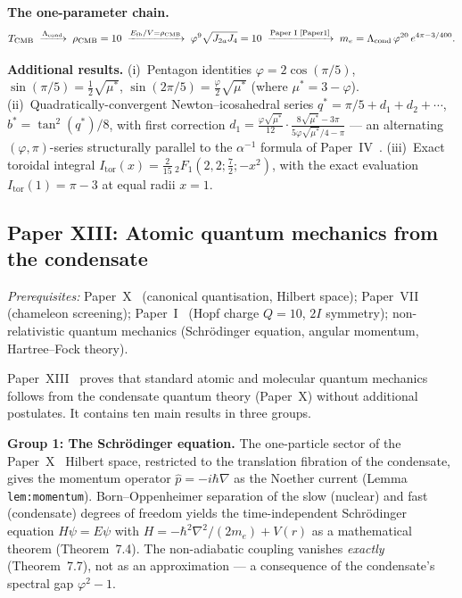 \documentclass[11pt,a4paper]{article}
\newcommand{\vp}{\varphi}
\newcommand{\twoI}{2I}
\newcommand{\TCMB}{T_{\mathrm{CMB}}}
\begin{document}
\textbf{The one-parameter chain.}
\[
  \TCMB
  \;\xrightarrow{\Lambda_{\mathrm{cond}}}\;
  \rho_{\mathrm{CMB}}=10
  \;\xrightarrow{E_{\mathrm{fb}}/V=\rho_{\mathrm{CMB}}}\;
  \vp^9\sqrt{J_{2a}J_4}=10
  \;\xrightarrow{\text{Paper~I~\cite{Paper1}}}\;
  m_e = \Lambda_{\mathrm{cond}}\,\vp^{20}\,e^{4\pi-3/400}.
\]

\textbf{Additional results.}
(i)~Pentagon identities $\vp=2\cos(\pi/5)$, $\sin(\pi/5)=\frac{1}{2}\sqrt{\mu^*}$,
$\sin(2\pi/5)=\frac{\vp}{2}\sqrt{\mu^*}$ (where $\mu^*=3-\vp$).
(ii)~Quadratically-convergent Newton--icosahedral series
$q^*=\pi/5+d_1+d_2+\cdots$, $b^*=\tan^2(q^*)/8$, with first correction
$d_1=\frac{\vp\sqrt{\mu^*}}{12}\cdot\frac{8\sqrt{\mu^*}-3\pi}{5\vp\sqrt{\mu^*}/4-\pi}$
--- an alternating $(\vp,\pi)$-series structurally parallel to the $\alpha^{-1}$
formula of Paper~IV~\cite{Paper4}.
(iii)~Exact toroidal integral
$I_{\mathrm{tor}}(x)=\frac{2}{15}\,{}_2F_1(2,2;\frac{7}{2};-x^2)$,
with the exact evaluation $I_{\mathrm{tor}}(1)=\pi-3$ at equal radii $x=1$.

\subsection{Paper XIII: Atomic quantum mechanics from the condensate}

\textit{Prerequisites:} Paper~X~\cite{Paper10} (canonical quantisation, Hilbert space);
Paper~VII~\cite{Paper7} (chameleon screening); Paper~I~\cite{Paper1} (Hopf charge $Q=10$, $\twoI$ symmetry);
non-relativistic quantum mechanics (Schr\"odinger equation, angular momentum,
Hartree--Fock theory).

Paper~XIII~\cite{Paper13} proves that standard atomic and molecular quantum mechanics follows
from the condensate quantum theory (Paper~X) without additional postulates.
It contains ten main results in three groups.

\textbf{Group 1: The Schr\"odinger equation.}
The one-particle sector of the Paper~X~\cite{Paper10} Hilbert space, restricted to the
translation fibration of the condensate, gives the momentum operator
$\hat{p} = -i\hbar\nabla$ as the Noether current (Lemma \texttt{lem:momentum}).
Born--Oppenheimer separation of the slow (nuclear) and fast (condensate)
degrees of freedom yields the time-independent Schr\"odinger equation
$H\psi = E\psi$ with $H = -\hbar^2\nabla^2/(2m_e) + V(r)$ as a mathematical
theorem (Theorem~7.4). The non-adiabatic coupling
vanishes \emph{exactly} (Theorem~7.7), not as an
approximation --- a consequence of the condensate's spectral gap $\vp^2-1$.
\end{document}

